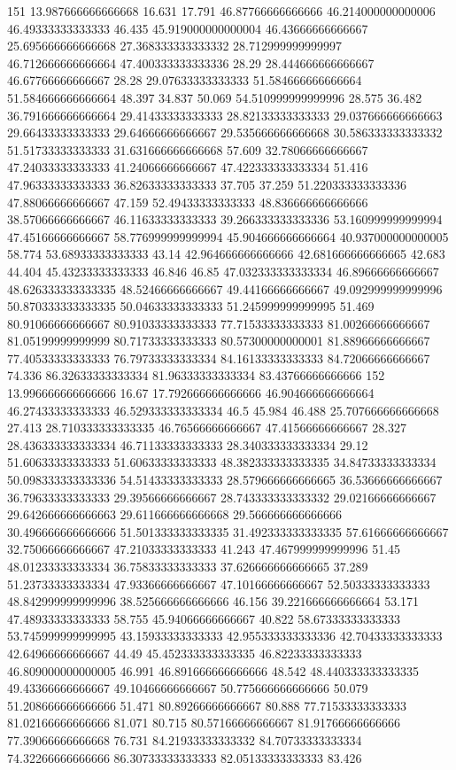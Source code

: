 151 13.987666666666668 16.631 17.791 46.87766666666666 46.214000000000006 46.49333333333333 46.435 45.919000000000004 46.43666666666667 25.695666666666668 27.368333333333332 28.712999999999997 46.712666666666664 47.400333333333336 28.29 28.444666666666667 46.67766666666667 28.28 29.07633333333333 51.584666666666664 51.584666666666664 48.397 34.837 50.069 54.510999999999996 28.575 36.482 36.791666666666664 29.41433333333333 28.82133333333333 29.037666666666663 29.66433333333333 29.64666666666667 29.535666666666668 30.586333333333332 51.51733333333333 31.631666666666668 57.609 32.78066666666667 47.24033333333333 41.24066666666667 47.422333333333334 51.416 47.96333333333333 36.82633333333333 37.705 37.259 51.220333333333336 47.88066666666667 47.159 52.49433333333333 48.836666666666666 38.57066666666667 46.11633333333333 39.266333333333336 53.160999999999994 47.45166666666667 58.776999999999994 45.904666666666664 40.937000000000005 58.774 53.68933333333333 43.14 42.964666666666666 42.681666666666665 42.683 44.404 45.43233333333333 46.846 46.85 47.032333333333334 46.89666666666667 48.626333333333335 48.52466666666667 49.44166666666667 49.092999999999996 50.870333333333335 50.04633333333333 51.245999999999995 51.469 80.91066666666667 80.91033333333333 77.71533333333333 81.00266666666667 81.05199999999999 80.71733333333333 80.57300000000001 81.88966666666667 77.40533333333333 76.79733333333334 84.16133333333333 84.72066666666667 74.336 86.32633333333334 81.96333333333334 83.43766666666666
152 13.996666666666666 16.67 17.792666666666666 46.904666666666664 46.27433333333333 46.529333333333334 46.5 45.984 46.488 25.707666666666668 27.413 28.710333333333335 46.76566666666667 47.41566666666667 28.327 28.436333333333334 46.71133333333333 28.340333333333334 29.12 51.60633333333333 51.60633333333333 48.382333333333335 34.84733333333334 50.098333333333336 54.51433333333333 28.579666666666665 36.53666666666667 36.79633333333333 29.39566666666667 28.743333333333332 29.02166666666667 29.642666666666663 29.611666666666668 29.566666666666666 30.496666666666666 51.501333333333335 31.492333333333335 57.61666666666667 32.75066666666667 47.21033333333333 41.243 47.467999999999996 51.45 48.01233333333334 36.75833333333333 37.626666666666665 37.289 51.23733333333334 47.93366666666667 47.10166666666667 52.50333333333333 48.842999999999996 38.525666666666666 46.156 39.221666666666664 53.171 47.48933333333333 58.755 45.94066666666667 40.822 58.67333333333333 53.745999999999995 43.15933333333333 42.955333333333336 42.70433333333333 42.64966666666667 44.49 45.452333333333335 46.82233333333333 46.809000000000005 46.991 46.891666666666666 48.542 48.440333333333335 49.43366666666667 49.10466666666667 50.775666666666666 50.079 51.208666666666666 51.471 80.89266666666667 80.888 77.71533333333333 81.02166666666666 81.071 80.715 80.57166666666667 81.91766666666666 77.39066666666668 76.731 84.21933333333332 84.70733333333334 74.32266666666666 86.30733333333333 82.05133333333333 83.426
